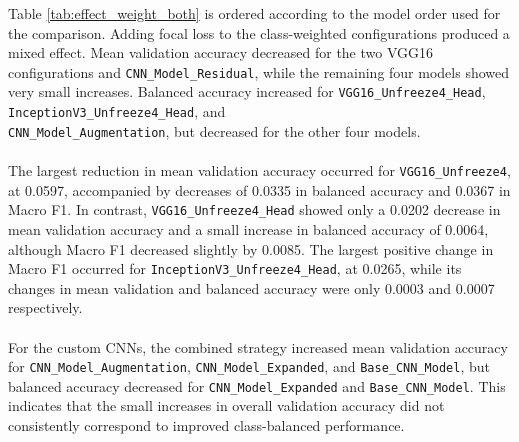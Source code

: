 \documentclass[12pt, a4paper]{report}
\begin{document}
				Table \ref{tab:effect_weight_both} is ordered according to the model order used for the comparison. Adding focal loss to the class-weighted configurations produced a mixed effect. Mean validation accuracy decreased for the two VGG16 configurations and \texttt{CNN\_Model\_Residual}, while the remaining four models showed very small increases. Balanced accuracy increased for \texttt{VGG16\_Unfreeze4\_Head}, \texttt{InceptionV3\_Unfreeze4\_Head}, and \\\texttt{CNN\_Model\_Augmentation}, but decreased for the other four models.\\\\
				The largest reduction in mean validation accuracy occurred for \texttt{VGG16\_Unfreeze4}, at 0.0597, accompanied by decreases of 0.0335 in balanced accuracy and 0.0367 in Macro F1. In contrast, \texttt{VGG16\_Unfreeze4\_Head} showed only a 0.0202 decrease in mean validation accuracy and a small increase in balanced accuracy of 0.0064, although Macro F1 decreased slightly by 0.0085. The largest positive change in Macro F1 occurred for \texttt{InceptionV3\_Unfreeze4\_Head}, at 0.0265, while its changes in mean validation and balanced accuracy were only 0.0003 and 0.0007 respectively.\\\\
				For the custom CNNs, the combined strategy increased mean validation accuracy for \texttt{CNN\_Model\_Augmentation}, \texttt{CNN\_Model\_Expanded}, and \texttt{Base\_CNN\_Model}, but balanced accuracy decreased for \texttt{CNN\_Model\_Expanded} and \texttt{Base\_CNN\_Model}. This indicates that the small increases in overall validation accuracy did not consistently correspond to improved class-balanced performance.\\
				\setlength{\tabcolsep}{3pt}
\end{document}
